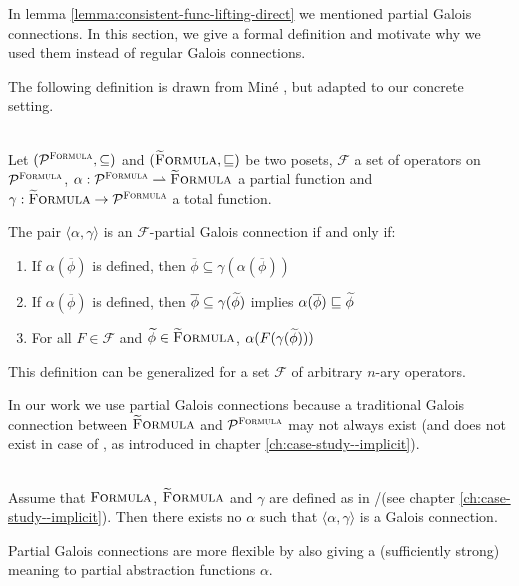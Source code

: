 In lemma \ref{lemma:consistent-func-lifting-direct} we mentioned partial Galois connections.
In this section, we give a formal definition and motivate why we used them instead of regular Galois connections.

The following definition is drawn from Miné \cite{mine2004weakly}, but adapted to our concrete setting.
\begin{definition}\label{def:pgc} ~\\
    Let $(\mathcal{P}^{\textup{\textsc{Formula}}}, \subseteq)$ and $(\textup{\textsc{\ensuremath{\widetilde{\text{F}}}ormula}}, \sqsubseteq)$ be two posets, $\mathcal{F}$ a set of operators on $\mathcal{P}^{\textup{\textsc{Formula}}}$, $\alpha : \mathcal{P}^{\textup{\textsc{Formula}}} \rightharpoonup \textup{\textsc{\ensuremath{\widetilde{\text{F}}}ormula}}$ a partial function and $\gamma : \textup{\textsc{\ensuremath{\widetilde{\text{F}}}ormula}} \rightarrow \mathcal{P}^{\textup{\textsc{Formula}}}$ a total function. 
    
    The pair $\langle \alpha, \gamma \rangle$ is an $\mathcal{F}$-partial Galois connection if and only if:
    \begin{enumerate}
        \item If $\alpha(\overline{\phi})$ is defined, then $\overline{\phi} \subseteq \gamma(\alpha(\overline{\phi}))$
        \item If $\alpha(\overline{\phi})$ is defined, then $\overline{\phi} \subseteq \gamma(\widetilde{\phi})$ implies $\alpha(\overline{\phi}) \sqsubseteq \widetilde{\phi}$
        \item For all $F \in \mathcal{F}$ and $\widetilde{\phi} \in \textup{\textsc{\ensuremath{\widetilde{\text{F}}}ormula}}$, $\alpha(F(\gamma(\widetilde{\phi})))$
    \end{enumerate}
This definition can be generalized for a set $\mathcal{F}$ of arbitrary $n$-ary operators.
\end{definition}

In our work we use partial Galois connections because a traditional Galois connection between $\textup{\textsc{\ensuremath{\widetilde{\text{F}}}ormula}}$ and $\mathcal{P}^{\textup{\textsc{Formula}}}$ may not always exist (and does not exist in case of \gvlidf, as introduced in chapter \ref{ch:case-study--implicit}).
\begin{lemma}~\\
    \label{lemma:gc-nonex}
    Assume that $\textup{\textsc{Formula}}$, $\textup{\textsc{\ensuremath{\widetilde{\text{F}}}ormula}}$ and $\gamma$ are defined as in \svlidf/\gvlidf (see chapter \ref{ch:case-study--implicit}).
    Then there exists no $\alpha$ such that $\langle \alpha, \gamma \rangle$ is a Galois connection.
\end{lemma}

Partial Galois connections are more flexible by also giving a (sufficiently strong) meaning to partial abstraction functions $\alpha$.



